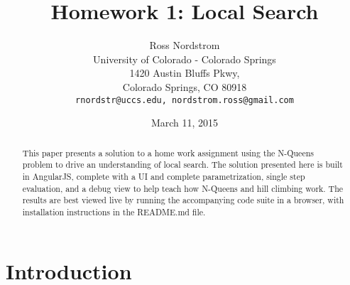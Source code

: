 \documentclass{sig-alternate}
\begin{document}
\title{Homework 1: Local Search}
\author{Ross Nordstrom\\
        University of Colorado - Colorado Springs\\
        1420 Austin Bluffs Pkwy,\\
        Colorado Springs, CO 80918\\
        \texttt{rnordstr@uccs.edu, nordstrom.ross@gmail.com}
       }
\date{March 11, 2015}

\maketitle

\begin{abstract}
   This paper presents a solution to a home work assignment using the N-Queens problem to drive
   an understanding of local search. The solution presented here is built in AngularJS, complete
   with a UI and complete parametrization, single step evaluation, and a debug view to help
   teach how N-Queens and hill climbing work. The results are best viewed live by running
   the accompanying code suite in a browser, with installation instructions in the README.md file.
\end{abstract}


\section{Introduction}




\end{document}
